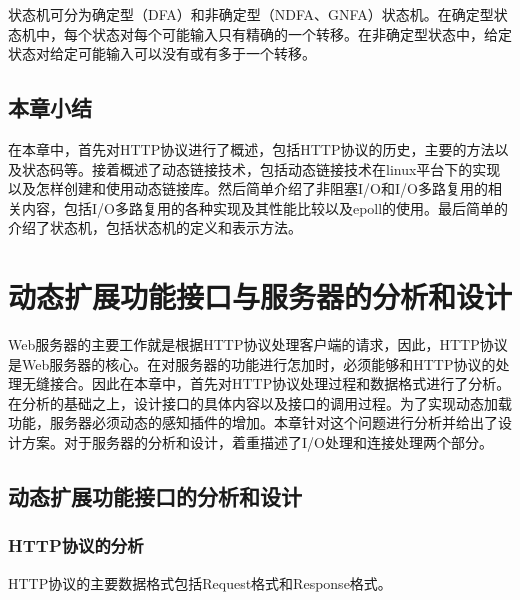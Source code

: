 \documentclass[twoside, xetex]{report}
\begin{document}
	状态机可分为确定型（DFA）和非确定型（NDFA、GNFA）状态机。在确定型状态机中，每个状态对每个可能输入只有精确的一个转移。在非确定型状态中，给定状态对给定可能输入可以没有或有多于一个转移。
	
\section{本章小结}
	在本章中，首先对HTTP协议进行了概述，包括HTTP协议的历史，主要的方法以及状态码等。接着概述了动态链接技术，包括动态链接技术在linux平台下的实现以及怎样创建和使用动态链接库。然后简单介绍了非阻塞I/O和I/O多路复用的相关内容，包括I/O多路复用的各种实现及其性能比较以及epoll的使用。最后简单的介绍了状态机，包括状态机的定义和表示方法。
	
\chapter{动态扩展功能接口与服务器的分析和设计}
	
	Web服务器的主要工作就是根据HTTP协议处理客户端的请求，因此，HTTP协议是Web服务器的核心。在对服务器的功能进行怎加时，必须能够和HTTP协议的处理无缝接合。因此在本章中，首先对HTTP协议处理过程和数据格式进行了分析。在分析的基础之上，设计接口的具体内容以及接口的调用过程。为了实现动态加载功能，服务器必须动态的感知插件的增加。本章针对这个问题进行分析并给出了设计方案。对于服务器的分析和设计，着重描述了I/O处理和连接处理两个部分。
	
\section{动态扩展功能接口的分析和设计}
\subsection{HTTP协议的分析}
	HTTP协议的主要数据格式包括Request格式和Response格式。
	
\end{document}
